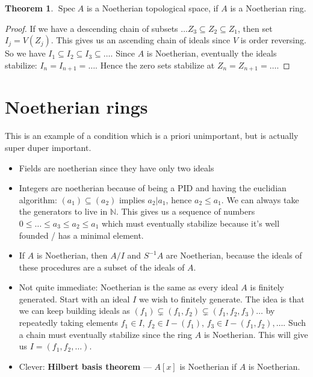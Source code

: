 \documentclass{book}
\newcommand{\spec}{\operatorname{Spec}}
\newcommand{\inv}{\ensuremath{-1}}
\theoremstyle{definition}
\newtheorem{theorem}{Theorem}
\begin{document}
\begin{theorem}
$\spec A$ is a Noetherian topological space, if $A$ is a Noetherian ring.
\end{theorem}
\begin{proof}
If we have a descending chain of subsets $\dots Z_3 \subseteq Z_2 \subseteq Z_1$,
then set $I_j = V(Z_j)$. This gives us an ascending chain of ideals
since $V$ is order reversing. So we have
$I_1 \subseteq I_2 \subseteq I_3 \subseteq \dots$. Since $A$ is
Noetherian, eventually the ideals stabilize: $I_n = I_{n+1} = \dots$. 
Hence the zero sets stabilize at $Z_n = Z_{n+1} = \dots$. 
\end{proof}

\section{Noetherian rings}
This is an example of a condition which is a priori unimportant, but is
actually super duper important.

\begin{itemize}
    \item Fields are noetherian since they have only two ideals
    \item Integers are noetherian because of being a PID and having the euclidian
    algorithm: $(a_1) \subseteq (a_2)$ implies $a_2 | a_1$, hence $a_2 \leq  a_1$. We can
    always take the generators to live in $\mathbb N$. This gives us a sequence
    of numbers $0 \leq \dots \leq  a_3 \leq  a_2 \leq  a_1$ which must
    eventually stabilize because it's well founded / has a minimal element.
    \item If $A$ is Noetherian, then $A/I$ and $S^\inv A$ are Noetherian,
    because the ideals of these procedures are a subset of the ideals of $A$. 

    \item Not quite immediate: Noetherian is the same as every ideal $A$ is
    finitely generated. Start with an ideal $I$ we wish to finitely generate.
    The idea is that we can keep building ideals as
    $(f_1) \subsetneq (f_1, f_2) \subsetneq (f_1, f_2, f_3) \dots$ by repeatedly
    taking elements $f_1 \in I$, $f_2 \in I - (f_1)$, $f_3 \in I - (f_1, f_2), \dots$.
    Such a chain must eventually stabilize since the ring $A$ is Noetherian. This
    will give us $I = (f_1, f_2, \dots)$.
    \item Clever: \textbf{Hilbert basis theorem} --- $A[x]$ is Noetherian if $A$
    is Noetherian.
\end{itemize}
\end{document}
